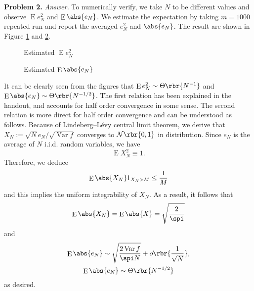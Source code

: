 \documentclass[english, nochinese]{pnote}
\DeclareMathOperator\ope{\mathrm{E}}
\DeclareMathOperator\opvar{\mathrm{Var}}
\begin{document}
\textbf{Problem 2.} \textit{Answer.} To numerically verify, we take $N$ to be different values and observe $ \ope e_N^2 $ and $ \ope \abs{e_N} $. We estimate the expectation by taking $ m = 1000 $ repeated run and report the averaged $e_N^2$ and $\abs{e_N}$. The result are shown in Figure \ref{Fig:ErrSq} and \ref{Fig:ErrAbs}.

\begin{figure}[htb]
\centering

\caption{Estimated $ \ope e_N^2 $}
\label{Fig:ErrSq}
\end{figure}

\begin{figure}[htb]
\centering

\caption{Estimated $ \ope \abs{e_N} $}
\label{Fig:ErrAbs}
\end{figure}

It can be clearly seen from the figures that $ \ope e_N^2 \sim \Theta \rbr{N^{-1}} $ and $ \ope \abs{e_N} \sim \Theta \rbr{N^{ -1 / 2 }} $. The first relation has been explained in the handout, and accounts for half order convergence in some sense. The second relation is more direct for half order convergence and can be understood as follows. Because of Lindeberg--L\'evy central limit theorem, we derive that $ X_N := \sqrt{N} e_N / \sqrt{ \opvar f } $ converges to $ \mathcal{N} \rbr{ 0, 1 } $ in distribution. Since $e_N$ is the average of $N$ i.i.d. random variables, we have
\begin{equation}
\ope X_N^2 \equiv 1.
\end{equation}
Therefore, we deduce
\begin{equation}
\ope \abs{X_N} 1_{ X_N > M } \le \frac{1}{M}
\end{equation}
and this implies the uniform integrability of $X_N$. As a result, it follows that
\begin{equation}
\ope \abs{X_N} = \ope \abs{X} = \sqrt{\frac{2}{\spi}}
\end{equation}
and
\begin{gather}
\ope \abs{e_N} \sim \sqrt{\frac{ 2 \opvar f }{ \spi N }} + o \rbr{\frac{1}{\sqrt{N}}}, \\
\ope \abs{e_N} \sim \Theta \rbr{N^{ -1 / 2 }}
\end{gather}
as desired.
\end{document}
